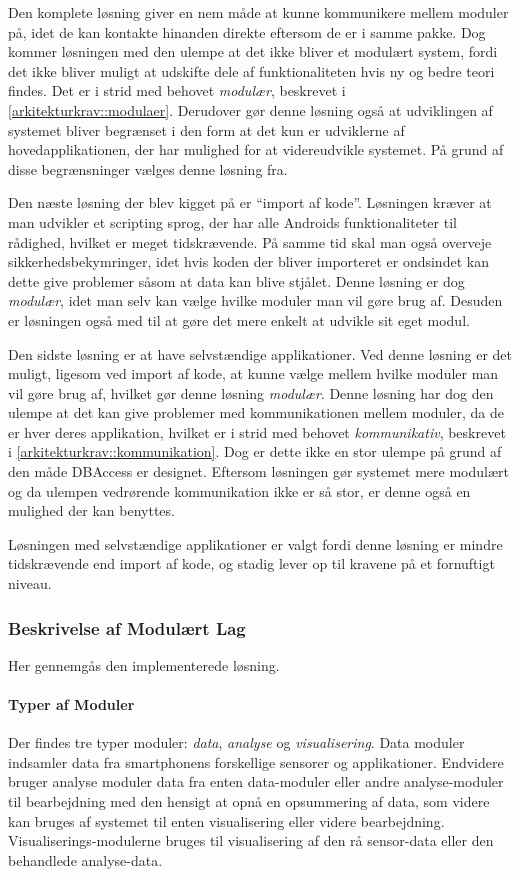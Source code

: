 Den komplete løsning giver en nem måde at kunne kommunikere mellem moduler på, idet de kan kontakte hinanden direkte eftersom de er i samme pakke.
Dog kommer løsningen med den ulempe at det ikke bliver et modulært system, fordi det ikke bliver muligt at udskifte dele af funktionaliteten hvis ny og bedre teori findes.
Det er i strid med behovet \textit{modulær}, beskrevet i \cref{arkitekturkrav::modulaer}.
Derudover gør denne løsning også at udviklingen af systemet bliver begrænset i den form at det kun er udviklerne af hovedapplikationen, der har mulighed for at videreudvikle systemet.
På grund af disse begrænsninger vælges denne løsning fra. 

Den næste løsning der blev kigget på er ``import af kode''.
Løsningen kræver at man udvikler et scripting sprog, der har alle Androids funktionaliteter til rådighed, hvilket er meget tidskrævende.
På samme tid skal man også overveje sikkerhedsbekymringer, idet hvis koden der bliver importeret er ondsindet kan dette give problemer såsom at data kan blive stjålet. 
Denne løsning er dog \textit{modulær}, idet man selv kan vælge hvilke moduler man vil gøre brug af.
Desuden er løsningen også med til at gøre det mere enkelt at udvikle sit eget modul.

Den sidste løsning er at have selvstændige applikationer.
Ved denne løsning er det muligt, ligesom ved import af kode, at kunne vælge mellem hvilke moduler man vil gøre brug af, hvilket gør denne løsning \textit{modulær}.
Denne løsning har dog den ulempe at det kan give problemer med kommunikationen mellem moduler, da de er hver deres applikation, hvilket er i strid med behovet \textit{kommunikativ}, beskrevet i \cref{arkitekturkrav::kommunikation}.
Dog er dette ikke en stor ulempe på grund af den måde DBAccess er designet.
Eftersom løsningen gør systemet mere modulært og da ulempen vedrørende kommunikation ikke er så stor, er denne også en mulighed der kan benyttes.

Løsningen med selvstændige applikationer er valgt fordi denne løsning er mindre tidskrævende end import af kode, og stadig lever op til kravene på et fornuftigt niveau.



\subsubsection{Beskrivelse af Modulært Lag}\label{modul_definition}
Her gennemgås den implementerede løsning.

\paragraph{Typer af Moduler}
Der findes tre typer moduler: \textit{data}, \textit{analyse} og \textit{visualisering}.
Data moduler indsamler data fra smartphonens forskellige sensorer og applikationer.
Endvidere bruger analyse moduler data fra enten data-moduler eller andre analyse-moduler til bearbejdning med den hensigt at opnå en opsummering af data, som videre kan bruges af systemet til enten visualisering eller videre bearbejdning.
Visualiserings-modulerne bruges til visualisering af den rå sensor-data eller den behandlede analyse-data.


